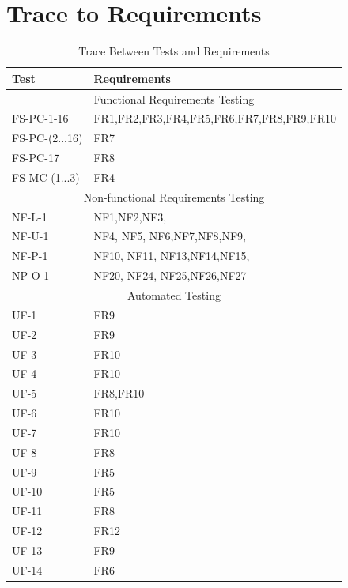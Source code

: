 \documentclass[12,english]{article}
\begin{document}
\section{Trace to Requirements}				

	
		\begin{table}[!htbp]
			\begin{tabular}{ll}
				\toprule
				Test & Requirements \\
				\midrule
				\multicolumn{2}{c}{Functional Requirements Testing} \\
				\midrule
				FS-PC-1-16 & FR1,FR2,FR3,FR4,FR5,FR6,FR7,FR8,FR9,FR10 \\
				FS-PC-(2...16) & FR7 \\
				FS-PC-17 & FR8 \\
				FS-MC-(1...3) & FR4 \\
	
				\midrule
				\multicolumn{2}{c}{Non-functional Requirements Testing} \\
				\midrule
				NF-L-1 & NF1,NF2,NF3,\\
				NF-U-1 & NF4, NF5, NF6,NF7,NF8,NF9, \\
				NF-P-1 & NF10, NF11, NF13,NF14,NF15, \\
				NP-O-1 & NF20, NF24, NF25,NF26,NF27 \\
				\midrule
				\multicolumn{2}{c}{Automated Testing} \\
				\midrule
				UF-1 & FR9\\
				UF-2 & FR9\\
				UF-3 & FR10\\
				UF-4 & FR10\\
				UF-5 & FR8,FR10 \\
				UF-6 & FR10\\
				UF-7 & FR10\\
				UF-8 & FR8\\
				UF-9 & FR5\\
				UF-10 & FR5\\
				UF-11 & FR8\\
				UF-12 & FR12\\
				UF-13 & FR9\\
				UF-14 & FR6\\
				\bottomrule
			\end{tabular}
			\caption{Trace Between Tests and Requirements}
			\makeatletter
			\def\rulecolor#1#{\CT@arc{#1}}
			\def\CT@arc#1#2{%
				\ifdim\baselineskip=\z@\noalign\fi
				{\gdef\CT@arc@{\color#1{#2}}}}
			\let\CT@arc@\relax
			\makeatother
			\label{Table}
		\end{table}
		
\end{document}
